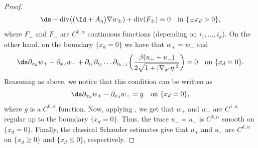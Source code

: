 \begin{proof}
\[\ds-\text{div}\big((\Id+A_\eta\big)\nabla w_\pm)+\text{div}(F_\pm)=0\quad\text{in } \{\pm x_d>0\},\]
where $F_+$ and $F_-$ are $C^{0,\alpha}$ continuous functions (depending on $i_1,\dots,i_k$). On the other hand, on the boundary $\{x_d=0\}$ we have that $w_+=w_-$ and
\[\ds\partial_{x_d}w_+-\partial_{x_d}w_-+\partial_{i_1}\partial_{i_2}\dots\partial_{i_{k-1}}\biggl(\frac{\beta (u_++u_-)}{2\sqrt{1+|\nabla_{x'}\eta|^2}}\biggr)=0\quad\text{on }\{x_d=0\}.\]
Reasoning as above, we notice that this condition can be written as
\[\ds\partial_{x_d}w_+-\partial_{x_d}w_-=g\quad\text{on }\{x_d=0\},\]
where $g$ is a $C^{0,\alpha}$ function.
Now, applying \cite[Th.\,1.2]{D}, we get that $w_+$ and $w_-$ are $C^{1,\alpha}$ regular up to the boundary $\{x_d=0\}$.
Thus, the trace $u_+=u_-$ is $C^{k,\alpha}$ smooth on $\{x_d=0\}$. Finally, the classical Schauder estimates give that $u_+$ and $u_-$ are $C^{k,\alpha}$ on $\{x_d\ge 0\}$ and $\{x_d\le 0\}$, respectively.
\end{proof}

